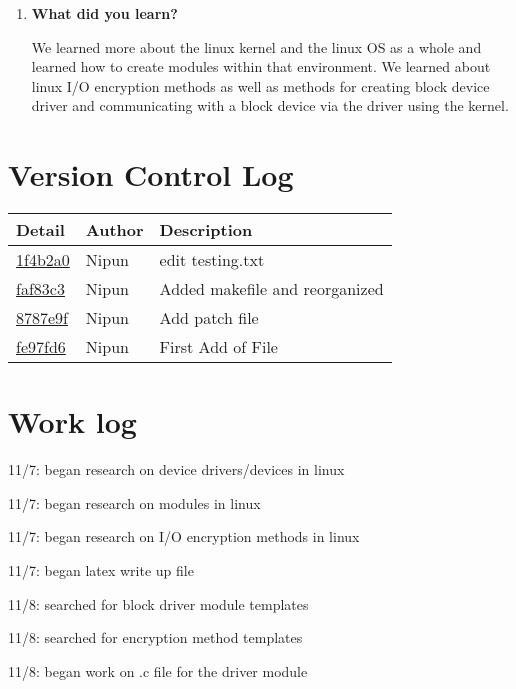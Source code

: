 \documentclass[onecolumn, draftclsnofoot,10pt, compsoc]{IEEEtran}
\begin{document}
\begin{enumerate}
		\item \textbf{What did you learn?}
	
		We learned more about the linux kernel and the linux OS as a whole and learned how to create
		modules within that environment. We learned about linux I/O encryption methods as well as methods for
		creating block device driver and communicating with a block device via the driver using the kernel. 
		
	\end{enumerate}

\section{Version Control Log}

\begin{tabular}{l l p{1.5in}}\textbf{Detail} & \textbf{Author} & \textbf{Description}\\\hline
	\href{https://github.com/NipunBathini/CS444/commit/1f3b2a036147a44d34f40c35604f5de969bdff76}{1f4b2a0} & Nipun & edit testing.txt\\\hline
	\href{https://github.com/NipunBathini/CS444/commit/faf83c302ee3c7cb1bab2586d302d8ff32c45602}{faf83c3} & Nipun & Added makefile and reorganized\\\hline
	\href{https://github.com/NipunBathini/CS444/commit/8787e9f738301c57976a08a0b3fadb9d79f1dfca}{8787e9f} & Nipun & Add patch file\\\hline
	\href{https://github.com/NipunBathini/CS444/commit/fe97fd648f38c2c9365bf1304f82c12b462905f4}{fe97fd6} & Nipun & First Add of File\\\hline
	\end{tabular}
	

\section{Work log}

	11/7: began research on device drivers/devices in linux
	
	11/7: began research on modules in linux
	
	11/7:  began research on I/O encryption methods in linux
	
	11/7: began latex write up file
	
	11/8: searched for block driver module templates
	
	11/8: searched for encryption method templates
	
	11/8: began work on .c file for the driver module
	
\end{document}
